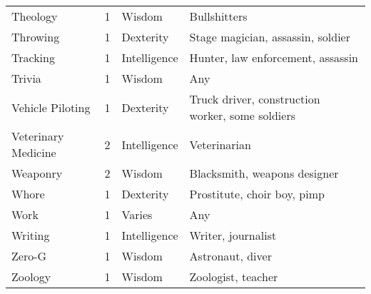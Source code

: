 \documentclass[twoside]{book}
\begin{document}
\begin{longtable}{p{1.25in}llp{12em}}
      \raggedright  Theology& 1& Wisdom& Bullshitters\tabularnewline
      \raggedright  Throwing& 1& Dexterity& Stage magician, assassin,
           soldier\tabularnewline
      \raggedright  Tracking& 1& Intelligence& Hunter, law enforcement,
           assassin\tabularnewline
      \raggedright  Trivia& 1& Wisdom& Any\tabularnewline
      \raggedright  Vehicle Piloting& 1& Dexterity& Truck driver,
           construction worker, some soldiers\tabularnewline
      \raggedright  Veterinary Medicine& 2& Intelligence& Veterinarian\tabularnewline
      \raggedright  Weaponry& 2& Wisdom& Blacksmith, weapons
           designer\tabularnewline
      \raggedright  Whore& 1& Dexterity& Prostitute, choir boy,
           pimp\tabularnewline
      \raggedright  Work& 1& Varies& Any\tabularnewline
      \raggedright  Writing& 1& Intelligence& Writer, journalist\tabularnewline
      \raggedright  Zero-G& 1& Wisdom& Astronaut, diver\tabularnewline
      \raggedright  Zoology& 1& Wisdom& Zoologist, teacher\tabularnewline
      
\end{longtable}
    
\end{document}
